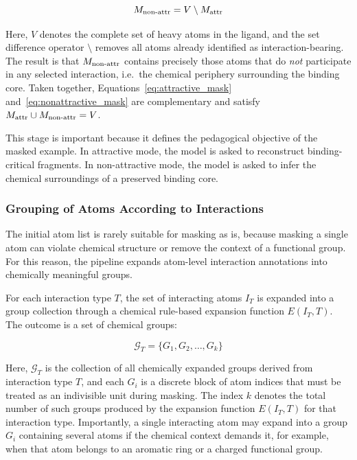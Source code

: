 \documentclass[a4paper,12pt]{article}
\begin{document}
\begin{equation}
    M_{\text{non\text{-}attr}} = V \setminus M_{\text{attr}}
    \label{eq:nonattractive_mask}
\end{equation}

\noindent
Here, $V$ denotes the complete set of heavy atoms in the ligand, and the set
difference operator $\setminus$ removes all atoms already identified as
interaction-bearing. The result is that $M_{\text{non\text{-}attr}}$ contains
precisely those atoms that do \emph{not} participate in any selected interaction,
i.e.\ the chemical periphery surrounding the binding core. Taken together,
Equations~\ref{eq:attractive_mask} and~\ref{eq:nonattractive_mask} are
complementary and satisfy $M_{\text{attr}} \cup M_{\text{non\text{-}attr}} = V$.

This stage is important because it defines the pedagogical objective of the
masked example. In attractive mode, the model is asked to reconstruct
binding-critical fragments. In non-attractive mode, the model is asked to infer
the chemical surroundings of a preserved binding core.

\subsubsection{Grouping of Atoms According to Interactions}

The initial atom list is rarely suitable for masking as is, because masking a
single atom can violate chemical structure or remove the context of a functional
group. For this reason, the pipeline expands atom-level interaction annotations
into chemically meaningful groups.

For each interaction type $T$, the set of interacting atoms $I_T$ is expanded
into a group collection through a chemical rule-based expansion function
$E(I_T, T)$. The outcome is a set of chemical groups:

\begin{equation}
    \mathcal{G}_T = \{ G_1, G_2, \ldots, G_k \}
    \label{eq:group_collection}
\end{equation}

\noindent
Here, $\mathcal{G}_T$ is the collection of all chemically expanded groups
derived from interaction type $T$, and each $G_i$ is a discrete block of atom
indices that must be treated as an indivisible unit during masking. The index
$k$ denotes the total number of such groups produced by the expansion function
$E(I_T, T)$ for that interaction type. Importantly, a single interacting atom
may expand into a group $G_i$ containing several atoms if the chemical context
demands it, for example, when that atom belongs to an aromatic ring or a
charged functional group.
\end{document}
